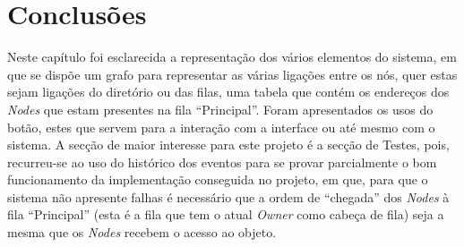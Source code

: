 \section{Conclusões}
\label{validacao:sec:conclusoes}
Neste capítulo foi esclarecida a representação dos vários elementos do sistema, em que se dispõe um
grafo para representar as várias ligações entre os nós, quer estas sejam ligações do diretório ou das filas, 
uma tabela que contém os endereços dos \emph{Nodes} que estam presentes na fila ``Principal''.
Foram apresentados os usos do botão, estes que servem para a interação com a interface ou até mesmo com o sistema.
A secção de maior interesse para este projeto é a secção de Testes, pois, recurreu-se ao uso do histórico dos eventos para 
se provar parcialmente o bom funcionamento da implementação conseguida no projeto, em que, para que o sistema não apresente falhas
é necessário que a ordem de ``chegada'' dos \emph{Nodes} à fila ``Principal'' (esta é a fila que tem o atual \emph{Owner} como cabeça de fila)
seja a mesma que os \emph{Nodes} recebem o acesso ao objeto.

